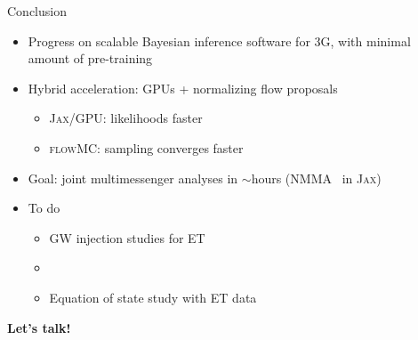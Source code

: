 \documentclass[usenames,dvipsnames,t]{beamer}
\begin{document}
\begin{frame}{Conclusion}
  \def\x{3mm}
  \def\y{1mm}

  \begin{itemize}
    \item Progress on scalable Bayesian inference software for 3G, with minimal amount of pre-training

    \vspace{\x}

    \item Hybrid acceleration: GPUs + normalizing flow proposals
    \begin{itemize}
      \vspace{\y}
      \item \textsc{Jax}/GPU: likelihoods faster

      \vspace{\y}

      \item \textsc{flowMC}: sampling converges faster
    \end{itemize}

    \vspace{\x}

    \item Goal: joint multimessenger analyses in $\sim$hours (\textsc{NMMA}~\cite{Pang:2022rzc} in \textsc{Jax})

    \vspace{\x}

    \item To do
    \begin{itemize}
      \vspace{\y}
      \item  GW injection studies for ET

      \vspace{\y}

      \item {}

      \vspace{\y}

      \item Equation of state study with ET data
    \end{itemize}
  \end{itemize}
  
  \vspace{4mm}

  \textbf{Let's talk!}
\end{frame}
\end{document}
